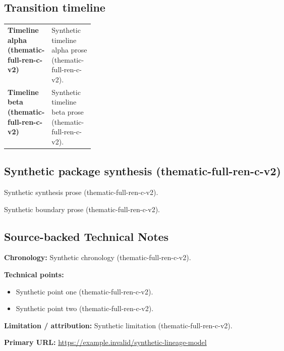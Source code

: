 \documentclass[lualatex,a4paper,10pt]{jlreq}
\begin{document}
\medskip
\begin{wideflow}
\subsection*{Transition timeline}
\begin{tabularx}{\linewidth}{@{}>{\bfseries}p{0.20\linewidth}X@{}}
Timeline alpha (thematic-full-ren-c-v2) & Synthetic timeline alpha prose (thematic-full-ren-c-v2). \cite{sp001lnd001} \\
Timeline beta (thematic-full-ren-c-v2) & Synthetic timeline beta prose (thematic-full-ren-c-v2). \cite{sp001lnd001} \\
\end{tabularx}
\end{wideflow}
\medskip
\begin{multicols}{2}
\subsection*{Synthetic package synthesis (thematic-full-ren-c-v2)}
\noindent Synthetic synthesis prose (thematic-full-ren-c-v2). \cite{sp001lnd001}\par\medskip
\end{multicols}
\medskip
\begin{claimboundary}
\noindent Synthetic boundary prose (thematic-full-ren-c-v2). \cite{sp001lnd001}\par
\end{claimboundary}
\medskip
\subsection*{Source-backed Technical Notes}
\begin{technicalnote}
\noindent\textbf{Chronology:} Synthetic chronology (thematic-full-ren-c-v2). \cite{sp001lnd001}\par
\smallskip\noindent\textbf{Technical points:}\par
\begin{itemize}
\item Synthetic point one (thematic-full-ren-c-v2). \cite{sp001lnd001}
\item Synthetic point two (thematic-full-ren-c-v2). \cite{sp001lnd001}
\end{itemize}
\noindent\textbf{Limitation / attribution:} Synthetic limitation (thematic-full-ren-c-v2).\par
\smallskip\noindent\textbf{Primary URL:} \url{https://example.invalid/synthetic-lineage-model}\par
\end{technicalnote}
\smallskip
\Needspace{0.30\textheight}
\end{document}
